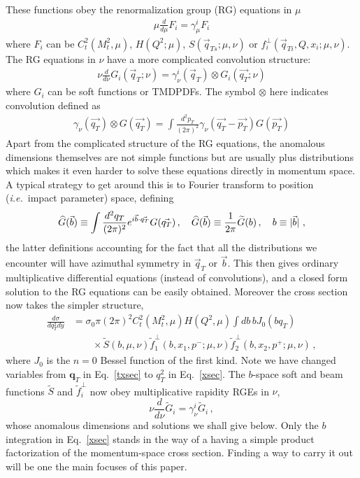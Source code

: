 \documentclass[a4,letterpaper,11pt]{article}
\newcommand{\nn}{\nonumber}
\newcommand{\be}{\begin{equation}}
\newcommand{\ee}{\end{equation}}
\newcommand{\bea}{\begin{eqnarray}}
\newcommand{\eea}{\end{eqnarray}}
\newcommand{\vect}[1]{\mathbf{#1}}
\newcommand{\abs}[1]{\left\lvert #1\right\rvert}
\newcommand{\ie}{\emph{i.e.}~}
\newcommand{\wt}{\widetilde}
\newcommand{\eq}[1]{Eq.~\eqref{#1}}
\begin{document}
These functions obey the renormalization group (RG) equations in $\mu$
\bea
\mu \frac{d }{d\mu} F_i =  \gamma_{\mu}^i F_i 
\eea
where $F_i$ can be $C_t^2(M_t^2, \mu)$,  $H(Q^2;\mu)$, $S(\vec{q}_{Ts};\mu,\nu)$ or $f_i^{\perp}(\vec{q}_{Ti}, Q, x_i;\mu ,\nu)$. The RG equations in $\nu$ have a more complicated convolution structure: 
\bea
\nu \frac{ d}{d\nu} G_i (\vec{q}_{T}; \nu) = \gamma_{\nu}^i( \vec{q}_{T}) \otimes G_i (\vec{ q_{T}} ;\nu)
\eea
where $G_i$ can be soft functions or TMDPDFs. The symbol $\otimes$ here indicates convolution defined as
\bea
\gamma_{\nu} (\vec{q_T}) \otimes G( \vec{q_T})= \int \frac{d^2p_T}{(2 \pi)^2} \gamma_{\nu} (\vec{q_T} - \vec{p_T} ) G( \vec{p_T})   
\eea
Apart from the complicated structure of the RG equations, the anomalous dimensions themselves are not simple functions but are usually plus distributions \cite{Chiu:2012ir}  which makes it even harder to solve these equations directly in momentum space. A typical strategy to get around this is to Fourier transform to position (\ie impact parameter) space, defining
\bea
\widehat G(\vec{b}) \equiv \int \frac{d^2 q_T}{(2\pi)^2} e^{i \vec{b} \cdot \vec{q_T}}G(\vec{q_T})  \,,\quad \widehat G(\vec{b}) \equiv \frac{1}{2\pi}\wt G(b)\,,\quad b\equiv \abs{\smash{\vec{b}}}\,,
\eea
the latter definitions accounting for the fact that all the distributions we encounter will have azimuthal symmetry in $\vec{q}_T$ or $\vec{b}$. This then gives ordinary multiplicative differential equations (instead of convolutions), and a closed form solution to the RG equations can be easily obtained. Moreover the cross section now takes the simpler structure,
\begin{align}
\label{xsec}
 \frac{ d \sigma} {dq_T^2 dy} &= \sigma_0 \pi (2\pi)^2 C_t^2(M_t^2, \mu) H (Q^2,\mu ) \int db\, b J_0( b q_T) \\
 &\qquad \times \wt S( b ,\mu,\nu) \wt f_1^{\perp}( b, x_1,p^-; \mu ,\nu) \wt f_2^{\perp}(  b, x_2, p^+;  \mu ,\nu)  \,,\nn
\end{align}
where $J_0$ is the $n=0$ Bessel function of the first kind. Note we have changed variables from $\vect{q}_T$ in \eq{txsec} to $q_T^2$ in \eq{xsec}. The $b$-space soft and beam functions $\wt S$ and $\wt f_i^\perp$  now obey multiplicative rapidity RGEs in $\nu$,
\be
\nu\frac{d}{d\nu}\wt G_i = \gamma_\nu^i \wt G_i\,,
\ee
whose anomalous dimensions and solutions we shall give below. Only the $b$ integration in \eq{xsec} stands in the way of a having a simple product factorization of the momentum-space cross section. Finding a way to carry it out will be one the main focuses of this paper.
\end{document}
